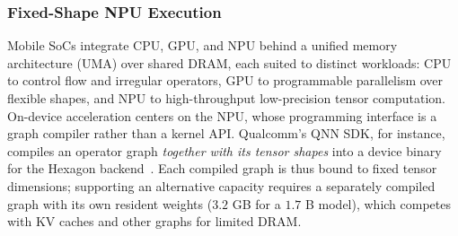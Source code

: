 \documentclass[sigconf,nonacm,10pt]{acmart}
\begin{document}
\subsubsection{Fixed-Shape NPU Execution} \label{sec:npu}
Mobile SoCs integrate CPU, GPU, and NPU behind a unified memory architecture (UMA) over shared DRAM, each suited to distinct workloads: CPU to control flow and irregular operators, GPU to programmable parallelism over flexible shapes, and NPU to high-throughput low-precision tensor computation. On-device acceleration centers on the NPU, whose programming interface is a graph compiler rather than a kernel API. Qualcomm's QNN SDK, for instance, compiles an operator graph \emph{together with its tensor shapes} into a device binary for the Hexagon backend~\cite{qnnsdk}. Each compiled graph is thus bound to fixed tensor dimensions; supporting an alternative capacity requires a separately compiled graph with its own resident weights ($3.2$ GB for a $1.7$ B model), which competes with KV caches and other graphs for limited DRAM.
\end{document}
